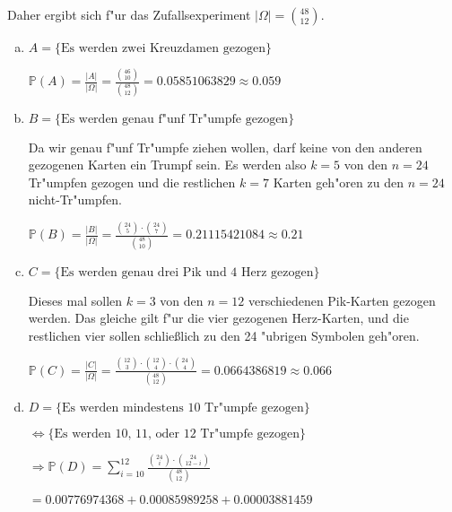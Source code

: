 \documentclass[a4paper,12pt]{article}
\begin{document}
    \bigskip

    Daher ergibt sich f"ur das Zufallsexperiment $ |\Omega| = \binom{48}{12} $.
    \begin{enumerate}[(a)]
        \item
        $ A = \{\text{Es werden zwei Kreuzdamen gezogen}\} $


        $ \displaystyle \mathbb{P}(A) = \frac{|A|}{|\Omega|} = \frac{\binom{46}{10}}{\binom{48}{12}} = 0.05851063829 \approx 0.059 $

        \item
        $ B = \{\text{Es werden genau f"unf Tr"umpfe gezogen}\} $ 

        Da wir genau f"unf Tr"umpfe ziehen wollen, darf keine von den anderen gezogenen Karten ein Trumpf sein.
        Es werden also $ k = 5 $ von den $ n = 24 $ Tr"umpfen gezogen und die restlichen $ k = 7 $ Karten geh"oren zu den $ n = 24 $ nicht-Tr"umpfen.

        $ \displaystyle \mathbb{P}(B) = \frac{|B|}{|\Omega|} = \frac{\binom{24}{5} \cdot \binom{24}{7}}{\binom{48}{10}} = 0.21115421084 \approx 0.21 $
        
        \item
        $ C = \{\text{Es werden genau drei Pik und 4 Herz gezogen}\} $

        Dieses mal sollen $ k = 3 $ von den $ n = 12 $ verschiedenen Pik-Karten gezogen werden. 
        Das gleiche gilt f"ur die vier gezogenen Herz-Karten, und die restlichen vier sollen schlie\ss lich zu den 24 "ubrigen Symbolen geh"oren.

        $ \displaystyle \mathbb{P}(C) = \frac{|C|}{|\Omega|} = \frac{\binom{12}{3} \cdot \binom{12}{4} \cdot \binom{24}{4}}{\binom{48}{12}} = 0.0664386819 \approx 0.066 $ 

        \item
        $ D = \{\text{Es werden mindestens 10 Tr"umpfe gezogen}\} $

        $ \Leftrightarrow \{\text{Es werden 10, 11, oder 12 Tr"umpfe gezogen}\} $

        $ \Rightarrow \displaystyle \mathbb{P}(D) = \sum_{i = 10}^{12}\frac{\binom{24}{i} \cdot \binom{24}{12-i}}{\binom{48}{12}} $ 

        $ = 0.00776974368 + 0.00085989258 + 0.00003881459 $


\end{enumerate}
\end{document}
